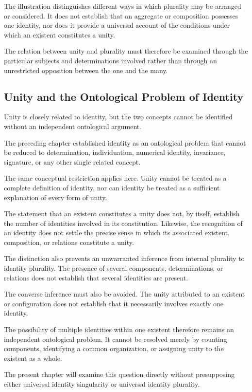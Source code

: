 The illustration distinguishes different ways
in which plurality may be arranged or considered.
It does not establish that an aggregate or
composition possesses one identity, nor does
it provide a universal account of the conditions
under which an existent constitutes a unity.

The relation between unity and plurality must
therefore be examined through the particular
subjects and determinations involved rather
than through an unrestricted opposition between
the one and the many.

\subsection{Unity and the Ontological Problem of Identity}

Unity is closely related to identity, but the
two concepts cannot be identified without
an independent ontological argument.

The preceding chapter established identity
as an ontological problem that cannot be
reduced to determination, individuation,
numerical identity, invariance, signature,
or any other single related concept.

The same conceptual restriction applies here.
Unity cannot be treated as a complete definition
of identity, nor can identity be treated as
a sufficient explanation of every form of unity.

The statement that an existent constitutes
a unity does not, by itself, establish the
number of identities involved in its constitution.
Likewise, the recognition of an identity does
not settle the precise sense in which its
associated existent, composition, or relations
constitute a unity.

The distinction also prevents an unwarranted
inference from internal plurality to identity
plurality. The presence of several components,
determinations, or relations does not establish
that several identities are present.

The converse inference must also be avoided.
The unity attributed to an existent or configuration
does not establish that it necessarily involves
exactly one identity.

The possibility of multiple identities within
one existent therefore remains an independent
ontological problem. It cannot be resolved
merely by counting components, identifying
a common organization, or assigning unity
to the existent as a whole.

The present chapter will examine this question
directly without presupposing either universal
identity singularity or universal identity plurality.


